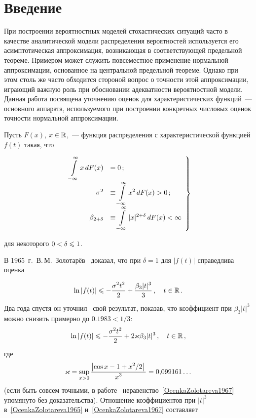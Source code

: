      \begin{multicols}{2}

      \label{st\stat}

\section{Введение}
\vspace*{6pt}

При построении вероятностных моделей стоха\-стических ситуаций часто в
качестве аналити\-ческой модели распределения вероятностей
используется его асимптотическая аппроксимация, воз\-ни\-ка\-ющая в
соответствующей предельной теореме. Примером может служить
повсеместное применение нормальной аппроксимации, основанное на
центральной предельной теореме. Однако при этом столь же часто
обходится стороной вопрос о точ\-ности этой аппроксимации, играющий
важную роль при обосновании адекватности вероятностной модели.
Данная работа посвящена уточнению оценок для характеристических
функций~--- основного аппарата, используемого при построении
конкретных числовых оценок точности нормальной аппроксимации.

Пусть $F(x)$, $x\in\mathbb R$,~--- функция распределения с
характеристической функцией $f(t)$ такая, что

\vspace*{6pt}

\noindent
\begin{equation}
\left.
\begin{array}{rl}
\displaystyle\int\limits_{-\infty}^\infty x\,dF(x)&=0\,;\\
\sigma^2&\equiv\displaystyle\int\limits_{-\infty}^\infty x^2\,dF(x)>0\,;\\
\beta_{2+\delta}&\equiv\displaystyle\int\limits_{-\infty}^\infty
|x|^{2+\delta}\,dF(x)<\infty
\end{array}
\right \}
\label{EDX1bet}
\end{equation}

\vspace*{6pt}

\noindent
для некоторого $0<\delta\leqslant1$.

В 1965~г.\ В.\,М.~Золотарёв~\cite{Zolotarev1965} доказал, что при
$\delta=1$ для $|f(t)|$ справедлива оценка

\noindent
\begin{equation}
\label{OcenkaZolotareva1965}
\ln|f(t)|\leqslant -\displaystyle\frac{\displaystyle \sigma^2t^2\mathstrut}{\displaystyle 2\mathstrut}+ \displaystyle\frac{\displaystyle \beta_3|t|^3\mathstrut}{\displaystyle 3\mathstrut}\,,\quad
t\in\mathbb R\,.
\end{equation}
Два года спустя он уточнил~\cite{Zolotarev1967a} свой результат,
показав, что коэффициент при $\beta_3|t|^3$ можно снизить примерно
до $0.1983<1/3$:
\begin{equation}
\label{OcenkaZolotareva1967}
\ln|f(t)|\leqslant -\displaystyle\frac{\displaystyle \sigma^2t^2\mathstrut}{\displaystyle 2\mathstrut}+ 2\varkappa\beta_3|t|^3\,,\quad t\in\mathbb R\,,
\end{equation}
где
$$
\varkappa= \sup_{x>0}\displaystyle\frac{\displaystyle \left|\cos x-1+x^2/2\right|\mathstrut}{\displaystyle x^3\mathstrut}=0{,}099161\ldots
$$
(если быть совсем точными, в работе~\cite{Zolotarev1967a}
неравенство~\eqref{OcenkaZolotareva1967} упомянуто без
доказательства). Отношение коэффициентов при $|t|^3$
в~\eqref{OcenkaZolotareva1965} и~\eqref{OcenkaZolotareva1967}
составляет


\end{multicols}
